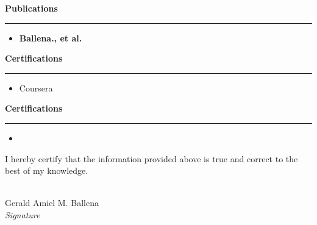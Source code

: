 \documentclass[a4paper,10pt]{article}
\newcommand{\sectiontitle}[1]{\vspace{10pt}\textbf{\Large #1}\vspace{5pt}\hrule\vspace{10pt}}
\begin{document}
	
	\sectiontitle{Publications}
	\begin{itemize}[left=0pt]
		\item \textbf{Ballena., et al.} 
	\end{itemize}
	
	\sectiontitle{Certifications}
	\begin{itemize}[left=0pt]
		\item Coursera
	\end{itemize}
	
	
	\sectiontitle{Certifications}
	\begin{itemize}[left=0pt]
		\item 
	\end{itemize}
	
	\vspace{20pt}
	\noindent I hereby certify that the information provided above is true and correct to the best of my knowledge.
	
	\vspace{40pt}
	\noindent\makebox[2in]{\hrulefill} \\
	Gerald Amiel M. Ballena\\
	\textit{Signature}
	
	
\end{document}
